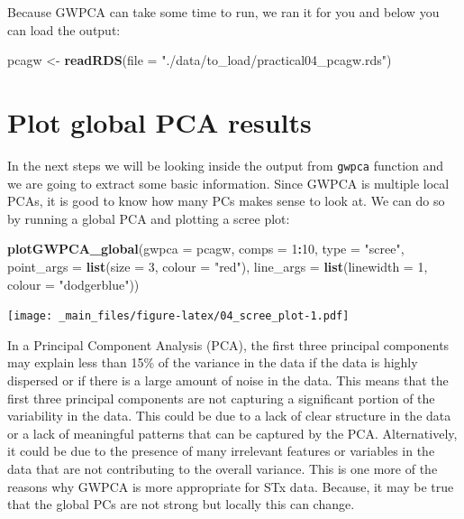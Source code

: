 \documentclass[
]{book}
\newenvironment{Shaded}{\begin{snugshade}}{\end{snugshade}}
\newcommand{\AttributeTok}[1]{\textcolor[rgb]{0.13,0.29,0.53}{#1}}
\newcommand{\DecValTok}[1]{\textcolor[rgb]{0.00,0.00,0.81}{#1}}
\newcommand{\FunctionTok}[1]{\textcolor[rgb]{0.13,0.29,0.53}{\textbf{#1}}}
\newcommand{\NormalTok}[1]{#1}
\newcommand{\OtherTok}[1]{\textcolor[rgb]{0.56,0.35,0.01}{#1}}
\newcommand{\SpecialCharTok}[1]{\textcolor[rgb]{0.81,0.36,0.00}{\textbf{#1}}}
\newcommand{\StringTok}[1]{\textcolor[rgb]{0.31,0.60,0.02}{#1}}
\begin{document}
Because GWPCA can take some time to run, we ran it for you and below you can load the output:

\begin{Shaded}
\begin{Highlighting}[]
\NormalTok{pcagw }\OtherTok{\textless{}{-}} \FunctionTok{readRDS}\NormalTok{(}\AttributeTok{file =} \StringTok{"./data/to\_load/practical04\_pcagw.rds"}\NormalTok{)}
\end{Highlighting}
\end{Shaded}

\hypertarget{plot-global-pca-results}{%
\section{Plot global PCA results}\label{plot-global-pca-results}}

In the next steps we will be looking inside the output from \texttt{gwpca} function and we are going to extract some basic information. Since GWPCA is multiple local PCAs, it is good to know how many PCs makes sense to look at. We can do so by running a global PCA and plotting a scree plot:

\begin{Shaded}
\begin{Highlighting}[]
\FunctionTok{plotGWPCA\_global}\NormalTok{(}\AttributeTok{gwpca =}\NormalTok{ pcagw,}
                 \AttributeTok{comps =} \DecValTok{1}\SpecialCharTok{:}\DecValTok{10}\NormalTok{,}
                 \AttributeTok{type =} \StringTok{"scree"}\NormalTok{,}
                 \AttributeTok{point\_args =} \FunctionTok{list}\NormalTok{(}\AttributeTok{size =} \DecValTok{3}\NormalTok{, }\AttributeTok{colour =} \StringTok{"red"}\NormalTok{),}
                 \AttributeTok{line\_args =} \FunctionTok{list}\NormalTok{(}\AttributeTok{linewidth =} \DecValTok{1}\NormalTok{, }\AttributeTok{colour =} \StringTok{"dodgerblue"}\NormalTok{))}
\end{Highlighting}
\end{Shaded}

\texttt{[image: \_main\_files/figure-latex/04\_scree\_plot-1.pdf]}

In a Principal Component Analysis (PCA), the first three principal components may explain less than 15\% of the variance in the data if the data is highly dispersed or if there is a large amount of noise in the data. This means that the first three principal components are not capturing a significant portion of the variability in the data. This could be due to a lack of clear structure in the data or a lack of meaningful patterns that can be captured by the PCA. Alternatively, it could be due to the presence of many irrelevant features or variables in the data that are not contributing to the overall variance. This is one more of the reasons why GWPCA is more appropriate for STx data. Because, it may be true that the global PCs are not strong but locally this can change.
\end{document}
